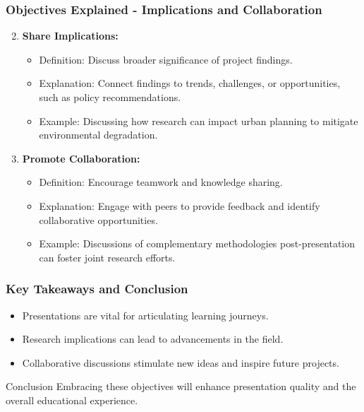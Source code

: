 \documentclass{beamer}
\begin{document}
\begin{frame}[fragile]
    \frametitle{Objectives Explained - Implications and Collaboration}
    \begin{enumerate}
        \setcounter{enumi}{1}
        \item \textbf{Share Implications:}
        \begin{itemize}
            \item Definition: Discuss broader significance of project findings.
            \item Explanation: Connect findings to trends, challenges, or opportunities, such as policy recommendations.
            \item Example: Discussing how research can impact urban planning to mitigate environmental degradation.
        \end{itemize}

        \item \textbf{Promote Collaboration:}
        \begin{itemize}
            \item Definition: Encourage teamwork and knowledge sharing.
            \item Explanation: Engage with peers to provide feedback and identify collaborative opportunities.
            \item Example: Discussions of complementary methodologies post-presentation can foster joint research efforts.
        \end{itemize}
    \end{enumerate}
\end{frame}

\begin{frame}[fragile]
    \frametitle{Key Takeaways and Conclusion}
    \begin{itemize}
        \item Presentations are vital for articulating learning journeys.
        \item Research implications can lead to advancements in the field.
        \item Collaborative discussions stimulate new ideas and inspire future projects.
    \end{itemize}

    \begin{block}{Conclusion}
        Embracing these objectives will enhance presentation quality and the overall educational experience.
    \end{block}
\end{frame}
\end{document}
